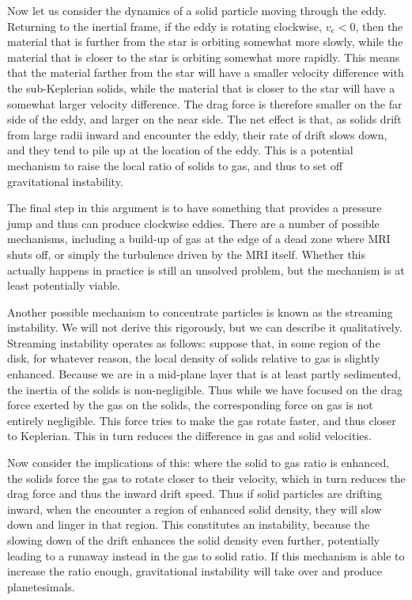 Now let us consider the dynamics of a solid particle moving through the eddy. Returning to the inertial frame, if the eddy is rotating clockwise, $v_e < 0$, then the material that is further from the star is orbiting somewhat more slowly, while the material that is closer to the star is orbiting somewhat more rapidly. This means that the material farther from the star will have a smaller velocity difference with the sub-Keplerian solids, while the material that is closer to the star will have a somewhat larger velocity difference. The drag force is therefore smaller on the far side of the eddy, and larger on the near side. The net effect is that, as solids drift from large radii inward and encounter the eddy, their rate of drift slows down, and they tend to pile up at the location of the eddy. This is a potential mechanism to raise the local ratio of solids to gas, and thus to set off gravitational instability.

The final step in this argument is to have something that provides a pressure jump and thus can produce clockwise eddies. There are a number of possible mechanisms, including a build-up of gas at the edge of a dead zone where MRI shuts off, or simply the turbulence driven by the MRI itself. Whether this actually happens in practice is still an unsolved problem, but the mechanism is at least potentially viable.

Another possible mechanism to concentrate particles is known as the streaming instability. We will not derive this rigorously, but we can describe it qualitatively. Streaming instability operates as follows: suppose that, in some region of the disk, for whatever reason, the local density of solids relative to gas is slightly enhanced. Because we are in a mid-plane layer that is at least partly sedimented, the inertia of the solids is non-negligible. Thus while we have focused on the drag force exerted by the gas on the solids, the corresponding force on gas is not entirely negligible. This force tries to make the gas rotate faster, and thus closer to Keplerian. This in turn reduces the difference in gas and solid velocities.

Now consider the implications of this: where the solid to gas ratio is enhanced, the solids force the gas to rotate closer to their velocity, which in turn reduces the drag force and thus the inward drift speed. Thus if solid particles are drifting inward, when the encounter a region of enhanced solid density, they will slow down and linger in that region. This constitutes an instability, because the slowing down of the drift enhances the solid density even further, potentially leading to a runaway instead in the gas to solid ratio. If this mechanism is able to increase the ratio enough, gravitational instability will take over and produce planetesimals.




